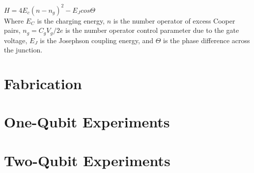 \documentclass[12pt,letterpaper,notitlepage]{report}
\begin{document}
$H=4E_c(n-n_g)^2-E_Jcos\Theta$ \\
Where $E_C$ is the charging energy, $n$ is the number operator of excess Cooper pairs, $n_g=C_gV_g/2e$ is the number operator control parameter due to the gate voltage, $E_J$ is the Josephson coupling energy, and $\Theta$ is the phase difference across the junction.

%
%

\section*{Fabrication}

%
%

\section*{One-Qubit Experiments}



%
%

\section*{Two-Qubit Experiments}



\end{document}
